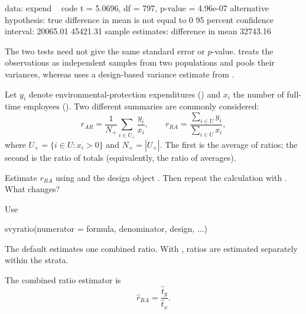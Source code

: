 \begin{Problem}
\begin{Subtask}
\begin{Solution}
\begin{Schunk}
\begin{Soutput}
data:  expend ~ code
t = 5.0696, df = 797, p-value = 4.96e-07
alternative hypothesis: true difference in mean is not equal to 0
95 percent confidence interval:
 20065.01 45421.31
sample estimates:
difference in mean 
          32743.16 
\end{Soutput}
\end{Schunk}

        The two tests need not give the same standard error or $p$-value.
         treats the observations as independent samples from
        two populations and pools their variances, whereas 
        uses a design-based variance estimate from .
    \end{Solution}

    \item Let $y_i$ denote environmental-protection expenditures
        () and $x_i$ the number of full-time employees
        (). Two different summaries are commonly considered:
        \begin{equation*}
            r_{AR}
            = \frac{1}{N_+}\sum_{i \in U_+}\frac{y_i}{x_i},
            \qquad
            r_{RA}
            = \frac{\sum_{i \in U} y_i}{\sum_{i \in U} x_i},
        \end{equation*}
        where $U_+ = \{i \in U:x_i>0\}$ and $N_+ = |U_+|$. The first is the
        average of ratios; the second is the ratio of totals
        (equivalently, the ratio of averages).

        Estimate $r_{RA}$ using  and the design object
        . Then repeat the calculation with
        . What changes?

        \begin{Rhint}
            Use

\begin{Scode}
svyratio(numerator = formula, denominator, design, ...)
\end{Scode}

            The default estimates one combined ratio. With , ratios are estimated separately within the strata.
        \end{Rhint}

    \begin{Solution}
        The combined ratio estimator is
        \begin{equation*}
            \widehat r_{RA}
            = \frac{\widehat t_y}{\widehat t_x}.
        \end{equation*}


\end{Solution}
\end{Subtask}
\end{Problem}
